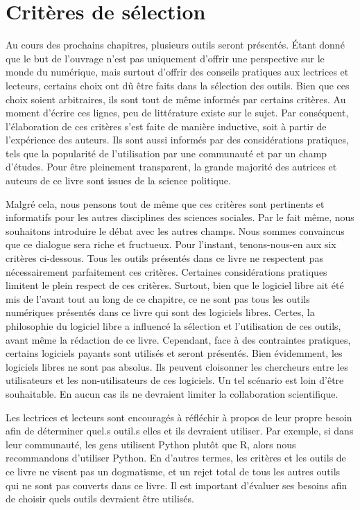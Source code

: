 \documentclass[
  letterpaper,
  DIV=11,
  numbers=noendperiod]{scrreprt}
\begin{document}
\section{Critères de sélection}\label{crituxe8res-de-suxe9lection}

Au cours des prochains chapitres, plusieurs outils seront présentés.
Étant donné que le but de l'ouvrage n'est pas uniquement d'offrir une
perspective sur le monde du numérique, mais surtout d'offrir des
conseils pratiques aux lectrices et lecteurs, certains choix ont dû être
faits dans la sélection des outils. Bien que ces choix soient
arbitraires, ils sont tout de même informés par certains critères. Au
moment d'écrire ces lignes, peu de littérature existe sur le sujet. Par
conséquent, l'élaboration de ces critères s'est faite de manière
inductive, soit à partir de l'expérience des auteurs. Ils sont aussi
informés par des considérations pratiques, tels que la popularité de
l'utilisation par une communauté et par un champ d'études. Pour être
pleinement transparent, la grande majorité des autrices et auteurs de ce
livre sont issues de la science politique.

Malgré cela, nous pensons tout de même que ces critères sont pertinents
et informatifs pour les autres disciplines des sciences sociales. Par le
fait même, nous souhaitons introduire le débat avec les autres champs.
Nous sommes convaincus que ce dialogue sera riche et fructueux. Pour
l'instant, tenons-nous-en aux six critères ci-dessous. Tous les outils
présentés dans ce livre ne respectent pas nécessairement parfaitement
ces critères. Certaines considérations pratiques limitent le plein
respect de ces critères. Surtout, bien que le logiciel libre ait été mis
de l'avant tout au long de ce chapitre, ce ne sont pas tous les outils
numériques présentés dans ce livre qui sont des logiciels libres.
Certes, la philosophie du logiciel libre a influencé la sélection et
l'utilisation de ces outils, avant même la rédaction de ce livre.
Cependant, face à des contraintes pratiques, certains logiciels payants
sont utilisés et seront présentés. Bien évidemment, les logiciels libres
ne sont pas absolus. Ils peuvent cloisonner les chercheurs entre les
utilisateurs et les non-utilisateurs de ces logiciels. Un tel scénario
est loin d'être souhaitable. En aucun cas ils ne devraient limiter la
collaboration scientifique.

Les lectrices et lecteurs sont encouragés à réfléchir à propos de leur
propre besoin afin de déterminer quel.s outil.s elles et ils devraient
utiliser. Par exemple, si dans leur communauté, les gens utilisent
Python plutôt que R, alors nous recommandons d'utiliser Python. En
d'autres termes, les critères et les outils de ce livre ne visent pas un
dogmatisme, et un rejet total de tous les autres outils qui ne sont pas
couverts dans ce livre. Il est important d'évaluer ses besoins afin de
choisir quels outils devraient être utilisés.
\end{document}
